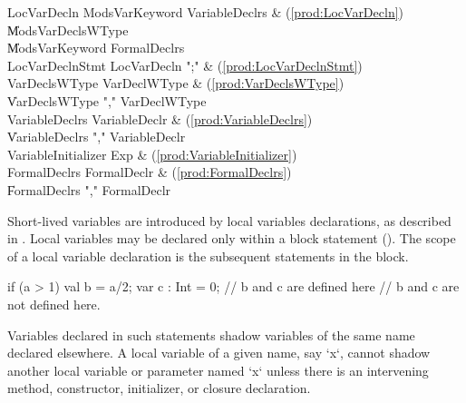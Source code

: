 \begin{bbgrammar}
         LocVarDecln \: Mods\opt VarKeyword VariableDeclrs & (\ref{prod:LocVarDecln}) \\
                     \| Mods\opt VarDeclsWType \\
                     \| Mods\opt VarKeyword FormalDeclrs \\
     LocVarDeclnStmt \: LocVarDecln \xcd";" & (\ref{prod:LocVarDeclnStmt}) \\
       VarDeclsWType \: VarDeclWType & (\ref{prod:VarDeclsWType}) \\
                     \| VarDeclsWType \xcd"," VarDeclWType \\
      VariableDeclrs \: VariableDeclr & (\ref{prod:VariableDeclrs}) \\
                     \| VariableDeclrs \xcd"," VariableDeclr \\
 VariableInitializer \: Exp & (\ref{prod:VariableInitializer}) \\
        FormalDeclrs \: FormalDeclr & (\ref{prod:FormalDeclrs}) \\
                     \| FormalDeclrs \xcd"," FormalDeclr \\
\end{bbgrammar}

Short-lived variables are introduced by local variables declarations, as
described in . Local variables may be declared only
within a block statement (). The scope of a local variable
declaration is the subsequent statements in the
block.   
\begin{xten}
  if (a > 1) {
     val b = a/2;
     var c : Int = 0;
     // b and c are defined here
  }
  // b and c are not defined here.
\end{xten}

Variables declared in such statements shadow variables of the same
name declared elsewhere.
A local variable of a given name, say \xcd`x`, cannot shadow another local
variable or parameter named \xcd`x` unless there is an intervening method,
constructor, initializer, or
closure declaration.


